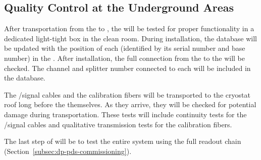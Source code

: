 \subsection{Quality Control at the Underground Areas}

After  transportation from the  to \surf, the  will be tested for proper functionality in a dedicated light-tight box in the clean room. During installation, the  database will be updated with the position of each  (identified by its serial number and base number) in the . After installation, the full connection from the  to the  will be checked. The  channel and splitter number connected to each  will be included in the  database.

The /signal cables and the calibration fibers will be transported to the cryostat roof long before the  themselves. As they arrive, they will be checked for potential damage during transportation. These tests will include continuity tests for the /signal cables and qualitative transmission tests for the calibration fibers.

The last step of  will be to test the entire system using the full readout chain (Section~\ref{subsec:dp-pds-commissioning}).
